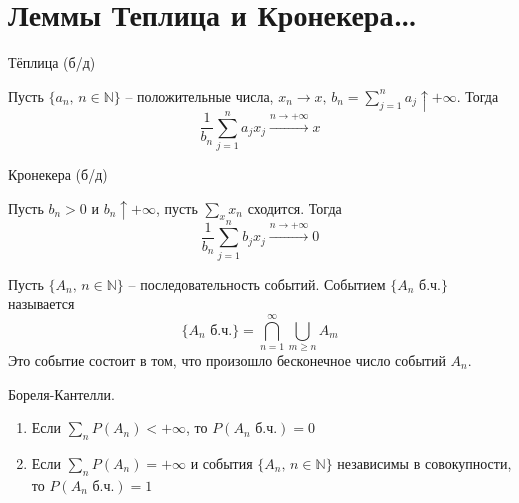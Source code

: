 \section{Леммы Теплица и Кронекера\dots}
\begin{lemma}
	Тёплица (б/д)

	Пусть $\{a_n,\, n \in \mathbb{N}\}$ -- положительные числа, $x_n \to x,\, b_n = \sum_{j = 1}^n a_j  \uparrow +\infty$. Тогда
	\[\frac{1}{b_n}\sum_{j = 1}^n a_jx_j \stackrel{n \to +\infty}{\to} x\]
\end{lemma}

\begin{lemma}
	Кронекера (б/д)

	Пусть $b_n > 0$ и $b_n \uparrow +\infty$, пусть $\sum_x x_n$ сходится. Тогда
	\[\frac{1}{b_n}\sum_{j = 1}^n b_jx_j \stackrel{n \to +\infty}{\to} 0\]
\end{lemma}

\begin{definition}
	Пусть $\{A_n,\, n \in \mathbb{N}\}$ -- последовательность событий. Событием $\{A_n \text{ б.ч.}\}$ называется
	\[\{A_n \text{ б.ч.}\} = \bigcap_{n = 1}^\infty \bigcup_{m \geq n} A_m\]
	Это событие состоит в том, что произошло бесконечное число событий $A_n$.
\end{definition}

\begin{lemma}
	Бореля-Кантелли.

	\begin{enumerate}
		\item Если $\sum_n P(A_n) < +\infty$, то $P(A_n \text{ б.ч.}) = 0$
		\item Если $\sum_n P(A_n) = +\infty$ и события $\{A_n,\, n \in \mathbb{N}\}$ независимы в совокупности, то $P(A_n \text{ б.ч.}) = 1$
	\end{enumerate}
\end{lemma}

